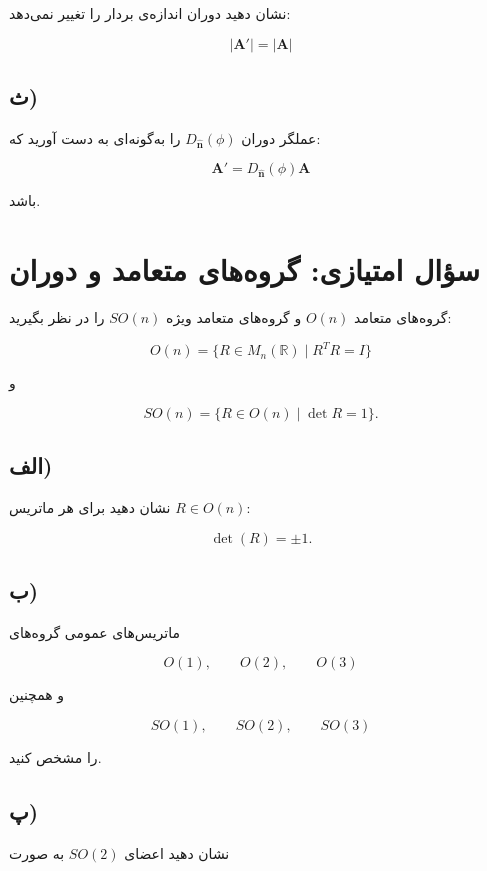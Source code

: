\documentclass[a4paper,16pt]{article}
\begin{document}
	نشان دهید دوران اندازه‌ی بردار را تغییر نمی‌دهد:
	
	\[
	\boxed{
		|\mathbf{A}'|=|\mathbf{A}|
	}
	\]
	
	\subsection*{ث)}
	
	عملگر دوران $D_{\hat{\mathbf{n}}}(\phi)$ را به‌گونه‌ای به دست آورید که:
	
	\[
	\boxed{
		\mathbf{A}'
		=
		D_{\hat{\mathbf{n}}}(\phi)\mathbf{A}
	}
	\]
	
	باشد.
	
	
	
	\section{سؤال امتیازی: گروه‌های متعامد و دوران}
	
	گروه‌های متعامد $O(n)$ و گروه‌های متعامد ویژه $SO(n)$ را در نظر بگیرید:
	
	\[
	O(n)=
	\{R\in M_n(\mathbb{R})\mid R^TR=I\}
	\]
	
	و
	
	\[
	SO(n)=
	\{R\in O(n)\mid\det R=1\}.
	\]
	
	\subsection*{الف)}
	
	نشان دهید برای هر ماتریس $R\in O(n)$:
	
	\[
	\det(R)=\pm1.
	\]
	
	\subsection*{ب)}
	
	ماتریس‌های عمومی گروه‌های
	
	\[
	O(1),\qquad O(2),\qquad O(3)
	\]
	
	و همچنین
	
	\[
	SO(1),\qquad SO(2),\qquad SO(3)
	\]
	
	را مشخص کنید.
	
	\subsection*{پ)}
	
	نشان دهید اعضای $SO(2)$ به صورت
	
\end{document}
